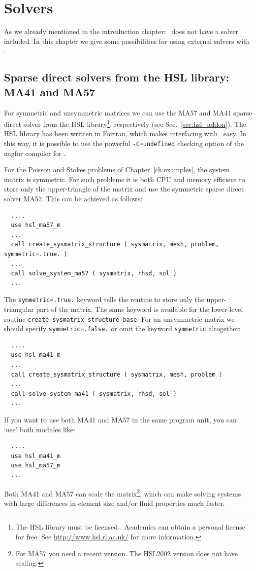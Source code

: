 
\chapter{Solvers}

\def\chaptertitle{Solvers}
\def\headdate{18th October 2023}

As we already mentioned in the introduction chapter: \tfem\ does not have
a solver included.
In this chapter we give some possibilities for using external solvers with
\tfem.

\section{Sparse direct solvers from the HSL library: MA41 and MA57}
\label{sec:hslsparse}

For symmetric and unsymmetric matrices we can use the MA57 and MA41
sparse direct solver from the HSL library\footnote{
The HSL library must be licensed \cite{HSL}. Academics can obtain a personal license for free.
See \href{http://www.hsl.rl.ac.uk/}{http://www.hsl.rl.ac.uk/} for more information.}, respectively (see Sec.~\ref{sec:hsl_addon}).
The HSL library has been written in Fortran, which makes interfacing with \tfem\ easy. In this way, it is possible to use the powerful \texttt{-C=undefined} checking option of the nagfor compiler for \tfem.

For the Poisson and Stokes problems of Chapter~\ref{ch:examples},
the system matrix is symmetric.
For such problems it is both
CPU and memory efficient to store only the upper-triangle of the matrix and
use the symmetric sparse direct solver MA57. This can be achieved as follows:
\begin{verbatim}
  ....
  use hsl_ma57_m
  ...
  call create_sysmatrix_structure ( sysmatrix, mesh, problem, symmetric=.true. )
  ...
  call solve_system_ma57 ( sysmatrix, rhsd, sol )
  ...
\end{verbatim}
The \texttt{symmetric=.true.} keyword tells the routine to store only the
upper-triangular part of the matrix. The same keyword is available for the
lower-level routine \texttt{create\_sysmatrix\_structure\_base}. For an
unsymmetric matrix we should specify \texttt{symmetric=.false.} or
omit the keyword \texttt{symmetric} altogether:
\begin{verbatim}
  ....
  use hsl_ma41_m
  ...
  call create_sysmatrix_structure ( sysmatrix, mesh, problem )
  ...
  call solve_system_ma41 ( sysmatrix, rhsd, sol )
  ...
\end{verbatim}
If you want to use both MA41 and MA57 in the same program unit, you can `use'
both modules like:
\begin{verbatim}
  ....
  use hsl_ma41_m
  use hsl_ma57_m
  ...
\end{verbatim}
Both MA41 and MA57 can scale the matrix\footnote{For MA57 you need a recent version. The HSL2002 version does not have scaling.}, which can make solving systems with large differences in element size and/or fluid properties much faster.

